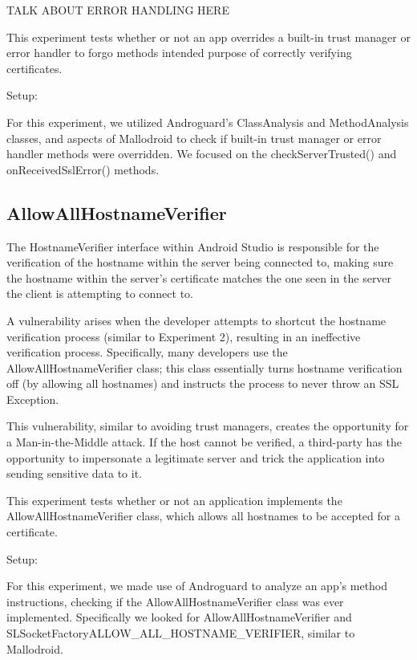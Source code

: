         TALK ABOUT ERROR HANDLING HERE

        This experiment tests whether or not an app overrides a built-in
        trust manager or error handler to forgo methods intended purpose of
        correctly verifying certificates.

        Setup:

        For this experiment, we utilized Androguard's ClassAnalysis and 
        MethodAnalysis classes, and aspects of Mallodroid to
        check if built-in trust manager or error handler methods were overridden. 
        We focused on the checkServerTrusted() and onReceivedSslError() methods. 

    \subsection{AllowAllHostnameVerifier}
    
        The HostnameVerifier interface within Android Studio is responsible for the 
        verification of the hostname within the server being connected to, making 
        sure the hostname within the server's certificate matches the one 
        seen in the server the client is attempting to connect to. 

        A vulnerability arises when the developer attempts to shortcut the 
        hostname verification process (similar to Experiment 2), resulting 
        in an ineffective verification process. Specifically, many 
        developers use the AllowAllHostnameVerifier class; this class 
        essentially turns hostname verification off (by allowing all 
        hostnames) and instructs the process to never throw an SSL 
        Exception.

        This vulnerability, similar to avoiding trust managers, creates 
        the opportunity for a Man-in-the-Middle attack. If the host 
        cannot be verified, a third-party has the opportunity to impersonate
        a legitimate server and trick the application into sending 
        sensitive data to it.

        This experiment tests whether or not an application 
        implements the AllowAllHostnameVerifier class, which allows 
        all hostnames to be accepted for a certificate.

        Setup:

        For this experiment, we made use of Androguard to analyze an app's 
        method instructions, checking if the AllowAllHostnameVerifier class 
        was ever implemented. Specifically we looked for AllowAllHostnameVerifier and 
        SLSocketFactory\;\-\>ALLOW\_ALL\_HOSTNAME\_VERIFIER, similar to Mallodroid.


